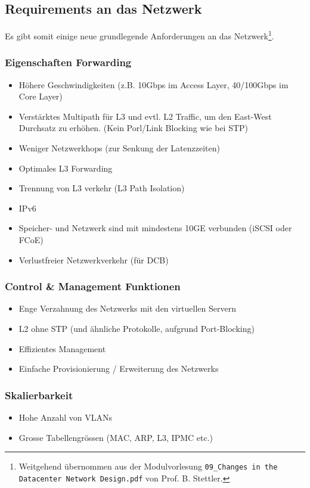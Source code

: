 \subsection{Requirements an das Netzwerk}
Es gibt somit einige neue grundlegende Anforderungen an das Netzwerk\footnote{Weitgehend übernommen aus der Modulvorlesung \lstinline|09_Changes in the Datacenter Network Design.pdf| von Prof. B. Stettler.}.
\subsubsection{Eigenschaften Forwarding}
\begin{itemize}
	\item Höhere Geschwindigkeiten (z.B. 10Gbps im Access Layer, 40/100Gbps im Core Layer)
	\item Verstärktes Multipath für L3 und evtl. L2 Traffic, um den East-West Durchsatz zu erhöhen. (Kein Porl/Link Blocking wie bei STP)
	\item Weniger Netzwerkhops (zur Senkung der Latenzzeiten)
	\item Optimales L3 Forwarding
	\item Trennung von L3 verkehr (L3 Path Isolation)
	\item IPv6
	\item Speicher- und Netzwerk sind mit mindestens 10GE verbunden (iSCSI oder FCoE)
	\item Verlustfreier Netzwerkverkehr (für DCB)
\end{itemize}

\subsubsection{Control \& Management Funktionen}
\begin{itemize}
	\item Enge Verzahnung des Netzwerks mit den virtuellen Servern
	\item L2 ohne STP (und ähnliche Protokolle, aufgrund Port-Blocking)
	\item Effizientes Management
	\item Einfache Provisionierung / Erweiterung des Netzwerks
\end{itemize}


\subsubsection{Skalierbarkeit}
\begin{itemize}
	\item Hohe Anzahl von VLANs
	\item Grosse Tabellengrössen (MAC, ARP, L3, IPMC etc.)
\end{itemize}


